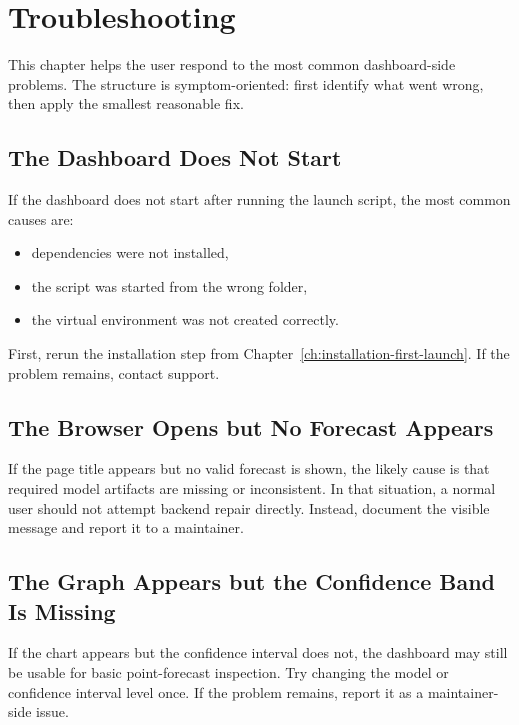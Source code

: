 %
%

\chapter{Troubleshooting}
\label{ch:troubleshooting}

This chapter helps the user respond to the most common dashboard-side problems. The structure is symptom-oriented: first identify what went wrong, then apply the smallest reasonable fix.

\section{The Dashboard Does Not Start}

If the dashboard does not start after running the launch script, the most common causes are:

\begin{itemize}
    \item dependencies were not installed,
    \item the script was started from the wrong folder,
    \item the virtual environment was not created correctly.
\end{itemize}

First, rerun the installation step from Chapter~\ref{ch:installation-first-launch}. If the problem remains, contact support.

\section{The Browser Opens but No Forecast Appears}

If the page title appears but no valid forecast is shown, the likely cause is that required model artifacts are missing or inconsistent. In that situation, a normal user should not attempt backend repair directly. Instead, document the visible message and report it to a maintainer.

\section{The Graph Appears but the Confidence Band Is Missing}

If the chart appears but the confidence interval does not, the dashboard may still be usable for basic point-forecast inspection. Try changing the model or confidence interval level once. If the problem remains, report it as a maintainer-side issue.

